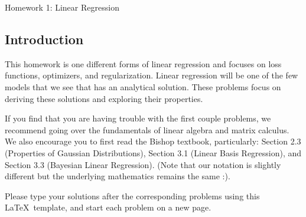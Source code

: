 \documentclass[submit]{harvardml}
\begin{document}
\begin{center}
{\Large Homework 1: Linear Regression}\\
\end{center}



\subsection*{Introduction}
This homework is one different forms of linear regression and focuses
on loss functions, optimizers, and regularization. Linear regression 
will be one of the few models that we see that has an analytical solution.
These problems focus on deriving  these solutions and exploring their 
properties. 

If you find that you are having trouble with the first couple
problems, we recommend going over the fundamentals of linear algebra
and matrix calculus. We also encourage you to first read the Bishop
textbook, particularly: Section 2.3 (Properties of Gaussian
Distributions), Section 3.1 (Linear Basis Regression), and Section 3.3
(Bayesian Linear Regression). (Note that our notation is slightly different but
the underlying mathematics remains the same :).

Please type your solutions after the corresponding problems using this \LaTeX\ template, and start each problem on a new page.\\

\pagebreak 
\end{document}

